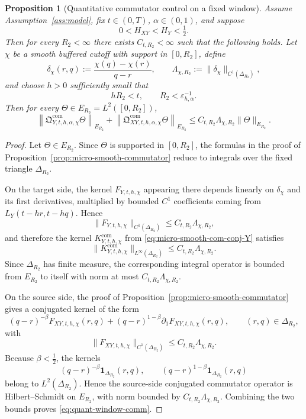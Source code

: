 \documentclass[11pt,a4paper]{amsart}
\theoremstyle{plain}
\newtheorem{proposition}[theorem]{Proposition}
\theoremstyle{definition}
\theoremstyle{remark}
\newcommand{\one}{\mathbf 1}
\begin{document}
\begin{proposition}[Quantitative commutator control on a fixed window]
\label{prop:quant-window-comm}
Assume Assumption~\ref{ass:model}, fix \(t\in(0,T)\), \(\alpha\in(0,1)\), and suppose
\[
0<H_{XY}<H_Y<\tfrac12.
\]
Then for every \(R_2<\infty\) there exists \(C_{t,R_2}<\infty\) such that the following holds.
Let \(\chi\) be a smooth buffered cutoff with support in \([0,R_2]\), define
\[
\delta_{\chi}(r,q):=\frac{\chi(q)-\chi(r)}{q-r},
\qquad
\Lambda_{\chi,R_2}:=\|\delta_{\chi}\|_{C^1(\Delta_{R_2})},
\]
and choose \(h>0\) sufficiently small that
\[
hR_2<t,
\qquad
R_2<\varepsilon_{h,\alpha}^{-1}.
\]
Then for every \(\Theta\in E_{R_2}=L^2([0,R_2])\),
\begin{equation}\label{eq:quant-window-comm}
\left\|
\mathfrak Q_{Y,t,h,\alpha,\chi}^{\mathrm{com}}\Theta
\right\|_{E_{R_2}}
+
\left\|
\mathfrak Q_{XY,t,h,\alpha,\chi}^{\mathrm{com}}\Theta
\right\|_{E_{R_2}}
\le
C_{t,R_2}\Lambda_{\chi,R_2}\|\Theta\|_{E_{R_2}}.
\end{equation}
\end{proposition}

\begin{proof}
Let \(\Theta\in E_{R_2}\). Since \(\Theta\) is supported in \([0,R_2]\), the formulas in the proof
of Proposition~\ref{prop:micro-smooth-commutator} reduce to integrals over the fixed triangle
\(\Delta_{R_2}\).

On the target side, the kernel \(F_{Y,t,h,\chi}\) appearing there depends linearly on
\(\delta_{\chi}\) and its first derivatives, multiplied by bounded \(C^1\) coefficients coming from
\(L_Y(t-hr,t-hq)\). Hence
\[
\|F_{Y,t,h,\chi}\|_{C^1(\Delta_{R_2})}\le C_{t,R_2}\Lambda_{\chi,R_2},
\]
and therefore the kernel \(K_{Y,t,h,\chi}^{\mathrm{com}}\) from
\eqref{eq:micro-smooth-com-conj-Y} satisfies
\[
\|K_{Y,t,h,\chi}^{\mathrm{com}}\|_{L^\infty(\Delta_{R_2})}
\le
C_{t,R_2}\Lambda_{\chi,R_2}.
\]
Since \(\Delta_{R_2}\) has finite measure, the corresponding integral operator is bounded from
\(E_{R_2}\) to itself with norm at most \(C_{t,R_2}\Lambda_{\chi,R_2}\).

On the source side, the proof of Proposition~\ref{prop:micro-smooth-commutator} gives a conjugated
kernel of the form
\[
(q-r)^{-\beta}F_{XY,t,h,\chi}(r,q)
+
(q-r)^{1-\beta}\partial_1F_{XY,t,h,\chi}(r,q),
\qquad (r,q)\in\Delta_{R_2},
\]
with
\[
\|F_{XY,t,h,\chi}\|_{C^1(\Delta_{R_2})}
\le
C_{t,R_2}\Lambda_{\chi,R_2}.
\]
Because \(\beta<\tfrac12\), the kernels
\[
(q-r)^{-\beta}\one_{\Delta_{R_2}}(r,q),
\qquad
(q-r)^{1-\beta}\one_{\Delta_{R_2}}(r,q)
\]
belong to \(L^2(\Delta_{R_2})\). Hence the source-side conjugated commutator operator is
Hilbert--Schmidt on \(E_{R_2}\), with norm bounded by \(C_{t,R_2}\Lambda_{\chi,R_2}\). Combining
the two bounds proves \eqref{eq:quant-window-comm}.
\end{proof}
\end{document}
